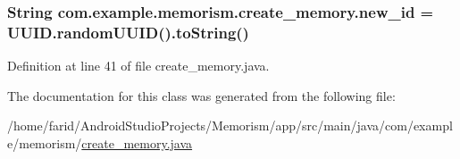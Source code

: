 \subsubsection[{\texorpdfstring{new\+\_\+id}{new_id}}]{\setlength{\rightskip}{0pt plus 5cm}String com.\+example.\+memorism.\+create\+\_\+memory.\+new\+\_\+id = U\+U\+I\+D.\+random\+U\+U\+ID().to\+String()\hspace{0.3cm}{\ttfamily [static]}}\hypertarget{classcom_1_1example_1_1memorism_1_1create__memory_a6ca3be37a6f7c9d83536809cfbd99dc1}{}\label{classcom_1_1example_1_1memorism_1_1create__memory_a6ca3be37a6f7c9d83536809cfbd99dc1}


Definition at line 41 of file create\+\_\+memory.\+java.



The documentation for this class was generated from the following file\+:\begin{DoxyCompactItemize}
\item 
/home/farid/\+Android\+Studio\+Projects/\+Memorism/app/src/main/java/com/example/memorism/\hyperlink{create__memory_8java}{create\+\_\+memory.\+java}\end{DoxyCompactItemize}
